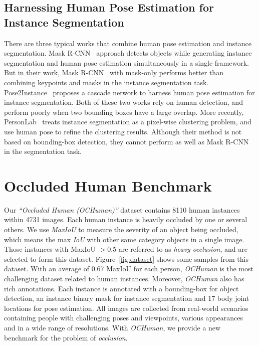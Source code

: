 \documentclass[10pt,twocolumn,letterpaper]{article}
\begin{document}
\subsection{Harnessing Human Pose Estimation for Instance Segmentation}
There are three typical works that combine human pose estimation and instance segmentation. Mask R-CNN~\cite{He2017Mask} approach detects objects while generating instance segmentation and human pose estimation simultaneously in a single framework. But in their work, Mask R-CNN~\cite{He2017Mask} with mask-only performs better than combining keypoints and masks in the instance segmentation task. Pose2Instance~\cite{tripathi2017pose2instance} proposes a cascade network to harness human pose estimation for instance segmentation. Both of these two works rely on human detection, and perform poorly when two bounding boxes have a large overlap. 
More recently, PersonLab~\cite{papandreou2018personlab} treats instance segmentation as a pixel-wise clustering problem, and use human pose to refine the clustering results. Although their method is not based on bounding-box detection, they cannot perform as well as Mask R-CNN~\cite{He2017Mask} in the segmentation task. 




 

\section{Occluded Human Benchmark}

Our \emph{``Occluded Human (OCHuman)''} dataset contains 8110 human instances within 4731 images. Each human instance is heavily occluded by one or several others. We use \emph{MaxIoU} to measure the severity of an object being occluded, which means the max \emph{IoU} with other same category objects in a single image. Those instances with MaxIoU $>$0.5 are referred to as \emph{heavy occlusion}, and are selected to form this dataset. Figure~\ref{fig:dataset} shows some samples from this dataset. With an average of 0.67 MaxIoU for each person, \emph{OCHuman} is the most challenging dataset related to human instances. Moreover, \emph{OCHuman} also has rich annotations. Each instance is annotated with a bounding-box for object detection, an instance binary mask for instance segmentation and 17 body joint locations for pose estimation. All images are collected from real-world scenarios containing people with challenging poses and viewpoints, various appearances and in a wide range of resolutions. With \emph{OCHuman}, we provide a new benchmark for the problem of \emph{occlusion}.
\end{document}
